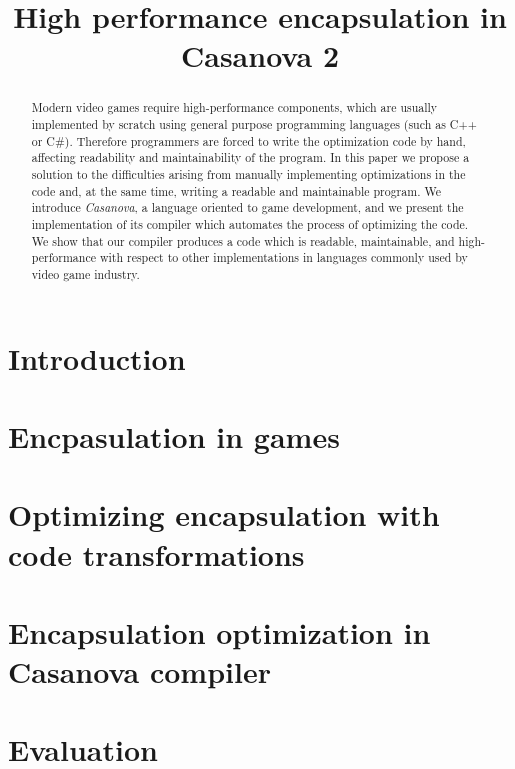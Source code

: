\documentclass[10pt,a4paper]{article}
\title{High performance encapsulation in Casanova 2}
\author{}
\date{}
\begin{document}
\maketitle
\begin{abstract}
Modern video games require high-performance components, which are usually implemented by scratch using general purpose programming languages (such as C++ or C\#). Therefore programmers are forced to write the optimization code by hand, affecting readability and maintainability of the program. In this paper we propose a solution to the difficulties arising from manually implementing optimizations in the code and, at the same time, writing a readable and maintainable program. We introduce \textit{Casanova}, a language oriented to game development, and we present the implementation of its compiler which automates the process of optimizing the code. We show that our compiler produces a code which is readable, maintainable, and high-performance with respect to other implementations in languages commonly used by video game industry.
\end{abstract}

\section{Introduction}
\label{sec:introduction}



\section{Encpasulation in games}
\label{sec:encapsulation}



\section{Optimizing encapsulation with code transformations}
\label{sec:optimization_overview}


\section{Encapsulation optimization in Casanova compiler}
\label{sec:implementation}


\section{Evaluation}
\label{sec:evaluation}



 

\end{document}
